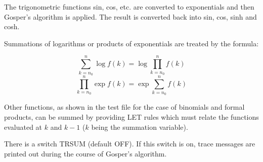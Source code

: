 The trigonometric functions sin, cos, etc. are converted to exponentials
and then Gosper's algorithm is applied.  The result is converted back into
sin, cos, sinh and cosh.

Summations of logarithms or products of exponentials are treated by the
formula:

\vspace{.1in}
\hspace*{2em} \[ \sum_{k=n_0}^{n} \log f(k) = \log \prod_{k=n_0}^n f(k) \]
\vspace{.1in}
\hspace*{2em} \[ \prod_{k=n_0}^n \exp f(k) = \exp \sum_{k=n_0}^n f(k) \]
\vspace{.1in}

Other functions, as shown in the test file for the case of binomials and
formal products, can be summed by providing LET rules which must relate the
functions evaluated at $k$ and $k - 1$ ($k$ being the summation variable).

 
There is a switch TRSUM (default OFF).  If this switch is on, trace
messages are printed out during the course of Gosper's algorithm.


